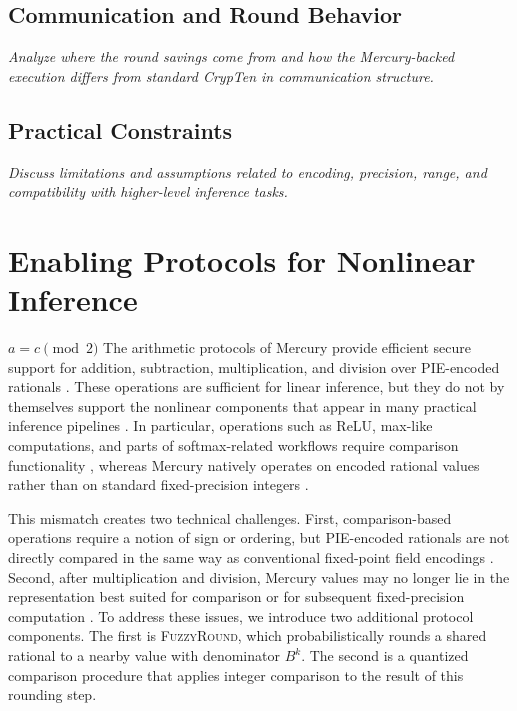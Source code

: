 \subsection{Communication and Round Behavior}
\textit{Analyze where the round savings come from and how the Mercury-backed execution differs from standard CrypTen in communication structure.}

\subsection{Practical Constraints}
\textit{Discuss limitations and assumptions related to encoding, precision, range, and compatibility with higher-level inference tasks.}

\section{Enabling Protocols for Nonlinear Inference}
\label{sec:nonlinear}
$a = c \pmod{2}$
The arithmetic protocols of Mercury provide efficient secure support for
addition, subtraction, multiplication, and division over PIE-encoded
rationals \cite{mercury-paper}. %
These operations are sufficient for linear inference, but they do not by
themselves support the nonlinear components that appear in many practical
inference pipelines \cite{crypten-paper,ppml-inference-survey}. %
In particular, operations such as ReLU, max-like computations, and parts
of softmax-related workflows require comparison functionality
\cite{crypten-paper,ppml-inference-survey}, %
whereas Mercury natively operates on encoded rational values rather than
on standard fixed-precision integers \cite{mercury-paper}. %

This mismatch creates two technical challenges. First, comparison-based
operations require a notion of sign or ordering, but PIE-encoded
rationals are not directly compared in the same way as conventional
fixed-point field encodings \cite{mercury-paper,fixed-point-mpc}. %
Second, after multiplication and division, Mercury values may no longer
lie in the representation best suited for comparison or for subsequent
fixed-precision computation \cite{mercury-paper}. %
To address these issues, we introduce two additional protocol
components. The first is \textsc{FuzzyRound}, which probabilistically
rounds a shared rational to a nearby value with denominator $B^k$. The
second is a quantized comparison procedure that applies integer
comparison to the result of this rounding step.

